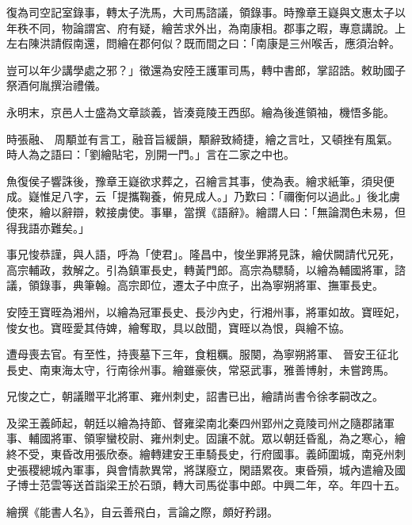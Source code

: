 \begin{pinyinscope}
 復為司空記室錄事，轉太子洗馬，大司馬諮議，領錄事。時豫章王嶷與文惠太子以年秩不同，物論謂宮、府有疑，繪苦求外出，為南康相。郡事之暇，專意講說。上左右陳洪請假南還，問繪在郡何似？既而間之曰：「南康是三州喉舌，應須治幹。



 豈可以年少講學處之邪？」徵還為安陸王護軍司馬，轉中書郎，掌詔誥。敕助國子祭酒何胤撰治禮儀。



 永明末，京邑人士盛為文章談義，皆湊竟陵王西邸。繪為後進領袖，機悟多能。



 時張融、
 周顒並有言工，融音旨緩韻，顒辭致綺捷，繪之言吐，又頓挫有風氣。時人為之語曰：「劉繪貼宅，別開一門。」言在二家之中也。



 魚復侯子響誅後，豫章王嶷欲求葬之，召繪言其事，使為表。繪求紙筆，須臾便成。嶷惟足八字，云「提攜鞠養，俯見成人。」乃歎曰：「禰衡何以過此。」後北虜使來，繪以辭辯，敕接虜使。事畢，當撰《語辭》。繪謂人曰：「無論潤色未易，但得我語亦難矣。」



 事兄悛恭謹，與人語，呼為「使君」。隆昌中，悛坐罪將見誅，繪伏闕請代兄死，高宗輔政，救解之。引為鎮軍長史，轉黃門郎。高宗為驃騎，以繪為輔國將軍，諮議，領錄事，典筆翰。高宗即位，遷太子中庶子，出為寧朔將軍、撫軍長史。



 安陸王寶晊為湘州，以繪為冠軍長史、長沙內史，行湘州事，將軍如故。寶晊妃，悛女也。寶晊愛其侍婢，繪奪取，具以啟聞，寶晊以為恨，與繪不協。



 遭母喪去官。有至性，持喪墓下三年，食粗糲。服闋，為寧朔將軍、
 晉安王征北長史、南東海太守，行南徐州事。繪雖豪俠，常惡武事，雅善博射，未嘗跨馬。



 兄悛之亡，朝議贈平北將軍、雍州刺史，詔書已出，繪請尚書令徐孝嗣改之。



 及梁王義師起，朝廷以繪為持節、督雍梁南北秦四州郢州之竟陵司州之隨郡諸軍事、輔國將軍、領寧蠻校尉、雍州刺史。固讓不就。眾以朝廷昏亂，為之寒心，繪終不受，東昏改用張欣泰。繪轉建安王車騎長史，行府國事。義師圍城，南兗州刺史張稷總城內軍事，與會情款異常，將謀廢立，閑語累夜。東昏殞，城內遣繪及國子博士范雲等送首詣梁王於石頭，轉大司馬從事中郎。中興二年，卒。年四十五。



 繪撰《能書人名》，自云善飛白，言論之際，頗好矜詡。




\end{pinyinscope}
